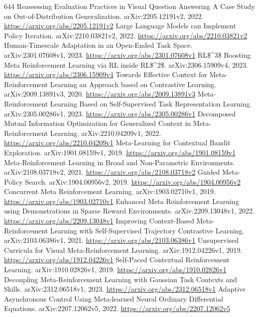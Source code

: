 \documentclass[11pt]{article}
\begin{document}
\begin{thebibliography}{644}
 Reassessing Evaluation Practices in Visual Question Answering A Case Study on Out-of-Distribution Generalization. arXiv:2205.12191v2, 2022. \url{https://arxiv.org/abs/2205.12191v2}
 Large Language Models can Implement Policy Iteration. arXiv:2210.03821v2, 2022. \url{https://arxiv.org/abs/2210.03821v2}
 Human-Timescale Adaptation in an Open-Ended Task Space. arXiv:2301.07608v1, 2023. \url{https://arxiv.org/abs/2301.07608v1}
 RL\$\textasciicircum{}3\$ Boosting Meta Reinforcement Learning via RL inside RL\$\textasciicircum{}2\$. arXiv:2306.15909v4, 2023. \url{https://arxiv.org/abs/2306.15909v4}
 Towards Effective Context for Meta-Reinforcement Learning an Approach based on Contrastive Learning. arXiv:2009.13891v3, 2020. \url{https://arxiv.org/abs/2009.13891v3}
 Meta-Reinforcement Learning Based on Self-Supervised Task Representation Learning. arXiv:2305.00286v1, 2023. \url{https://arxiv.org/abs/2305.00286v1}
 Decomposed Mutual Information Optimization for Generalized Context in Meta-Reinforcement Learning. arXiv:2210.04209v1, 2022. \url{https://arxiv.org/abs/2210.04209v1}
 Meta-Learning for Contextual Bandit Exploration. arXiv:1901.08159v1, 2019. \url{https://arxiv.org/abs/1901.08159v1}
 Meta-Reinforcement Learning in Broad and Non-Parametric Environments. arXiv:2108.03718v2, 2021. \url{https://arxiv.org/abs/2108.03718v2}
 Guided Meta-Policy Search. arXiv:1904.00956v2, 2019. \url{https://arxiv.org/abs/1904.00956v2}
 Concurrent Meta Reinforcement Learning. arXiv:1903.02710v1, 2019. \url{https://arxiv.org/abs/1903.02710v1}
 Enhanced Meta Reinforcement Learning using Demonstrations in Sparse Reward Environments. arXiv:2209.13048v1, 2022. \url{https://arxiv.org/abs/2209.13048v1}
 Improving Context-Based Meta-Reinforcement Learning with Self-Supervised Trajectory Contrastive Learning. arXiv:2103.06386v1, 2021. \url{https://arxiv.org/abs/2103.06386v1}
 Unsupervised Curricula for Visual Meta-Reinforcement Learning. arXiv:1912.04226v1, 2019. \url{https://arxiv.org/abs/1912.04226v1}
 Self-Paced Contextual Reinforcement Learning. arXiv:1910.02826v1, 2019. \url{https://arxiv.org/abs/1910.02826v1}
 Decoupling Meta-Reinforcement Learning with Gaussian Task Contexts and Skills. arXiv:2312.06518v1, 2023. \url{https://arxiv.org/abs/2312.06518v1}
 Adaptive Asynchronous Control Using Meta-learned Neural Ordinary Differential Equations. arXiv:2207.12062v5, 2022. \url{https://arxiv.org/abs/2207.12062v5}

\end{thebibliography}
\end{document}
